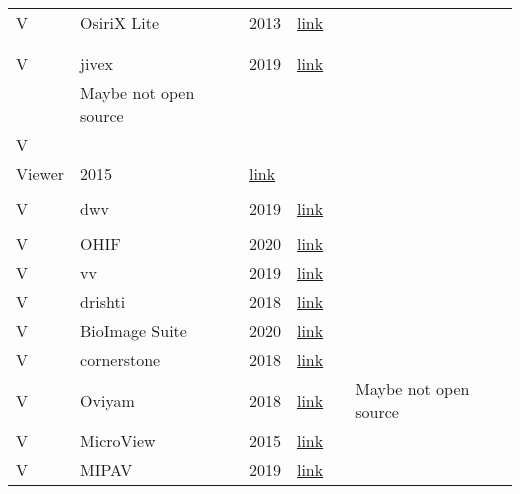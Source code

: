 \documentclass{article}
\begin{document}
\begin{longtable}{|l|l|l|l|l|l|}
V & OsiriX Lite & 2013 & \href{https://github.com/pixmeo/osirix}{link} & \begin{tabular}[c]{@{}l@{}}\citep{Bjorn2017}\\ \citep{Bruhschwein2019}\\ \citep{Haak2015}\end{tabular} &  \\ \hline
V & jivex & 2019 & \href{https://www.visus.com/en/downloads/jivex-dicom-viewer.html}{link} & \begin{tabular}[c]{@{}l@{}}\citep{Mu2019}\\ \citep{Haak2015}\end{tabular} & Maybe not open source \\ \hline
V & \begin{tabular}[c]{@{}l@{}}Open Dicom\\ Viewer\end{tabular} & 2015 & \href{https://sourceforge.net/projects/opendicomviewer/}{link} & \begin{tabular}[c]{@{}l@{}}\citep{Mu2019}\\ \citep{Haak2015}\end{tabular} &  \\ \hline
V & dwv & 2019 & \href{https://ivmartel.github.io/dwv/}{link} & \begin{tabular}[c]{@{}l@{}}\citep{Bjorn2017}\\ \citep{Haak2015}\end{tabular} &  \\ \hline
V & OHIF & 2020 & \href{http://ohif.org/}{link} & \citep{Bjorn2017} &  \\ \hline
V & vv & 2019 & \href{https://github.com/open-vv/vv}{link} & \citep{Bjorn2017} &  \\ \hline
V & drishti & 2018 & \href{https://github.com/nci/drishti}{link} & \citep{Bjorn2017} &  \\ \hline
V & BioImage Suite & 2020 & \href{https://bioimagesuiteweb.github.io/webapp/}{link} & \citep{Haak2015} &  \\ \hline
V & cornerstone & 2018 & \href{https://github.com/cornerstonejs/cornerstone/releases}{link} & \citep{Haak2015} &  \\ \hline
V & Oviyam & 2018 & \href{http://oviyam.raster.in/index.html}{link} & \citep{Haak2015} & Maybe not open source \\ \hline
V & MicroView & 2015 & \href{http://microview.sourceforge.net/}{link} & \citep{Haak2015} &  \\ \hline
V & MIPAV & 2019 & \href{https://mipav.cit.nih.gov/}{link} & \citep{Haak2015} &  \\ \hline

\end{longtable}
\end{document}
